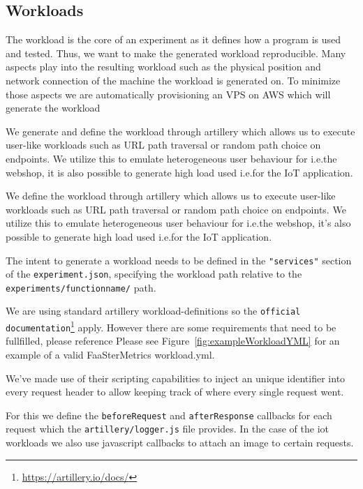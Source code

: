 \documentclass[../main.tex]{subfiles}
\begin{document}
\subsection{Workloads}\label{sec:WorkloadsStructure}

The workload is the core of an experiment as it defines how a program is used and tested. 
Thus, we want to make the generated workload reproducible. 
Many aspects play into the resulting workload such as the physical position and network connection of the machine the workload is generated on. 
To minimize those aspects we are automatically provisioning an VPS on AWS which will generate the workload

We generate and define the workload through artillery which allows us to execute user-like workloads 
such as URL path traversal or random path choice on endpoints. 
We utilize this to emulate heterogeneous user behaviour for i.e.\@ the webshop, 
it is also possible to generate high load used i.e.\@ for the IoT application.

We define the workload through artillery which allows us to execute user-like workloads such as URL path traversal or random path choice on endpoints. We utilize this to emulate heterogeneous user behaviour for i.e.\@ the webshop, it's also possible to generate high load used i.e.\@ for the IoT application.

The intent to generate a workload needs to be defined in the \texttt{"services"} section of the \texttt{experiment.json}, specifying the workload path relative to the \texttt{experiments/functionname/} path. %

We are using standard artillery workload-definitions so the \texttt{official documentation}\footnote{\url{https://artillery.io/docs/}} apply. However there are some requirements that need to be fullfilled, please reference %
Please see Figure~\ref{fig:exampleWorkloadYML} for an example of a valid FaaSterMetrics workload.yml.

We've made use of their scripting capabilities to inject an unique identifier into every request header to allow keeping track of where every single request went. 

For this we define the \texttt{beforeRequest} and \texttt{afterResponse} callbacks for each request which the \texttt{artillery/logger.js} file provides.
In the case of the iot workloads we also use javascript callbacks to attach an image to certain requests.
\end{document}
